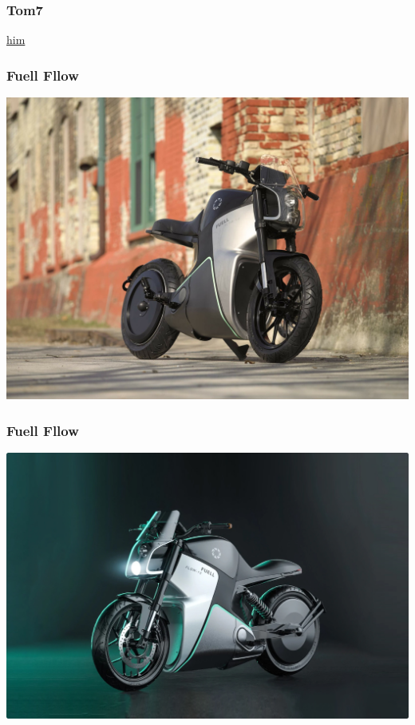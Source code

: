 \documentclass{beamer}
\begin{document}
\begin{frame}
	\frametitle{Tom7}
	\href{https://youtu.be/QVn2PZGZxaI?si=q5VhH5EPsQtNoula&t=31}{him}
\end{frame}

\begin{frame}
	\frametitle{Fuell Fllow}
	\includegraphics[scale=0.1]{fllow1.jpg}
\end{frame}

\begin{frame}
	\frametitle{Fuell Fllow}
	\includegraphics[scale=0.3]{fllow2.jpeg}
\end{frame}
\end{document}
